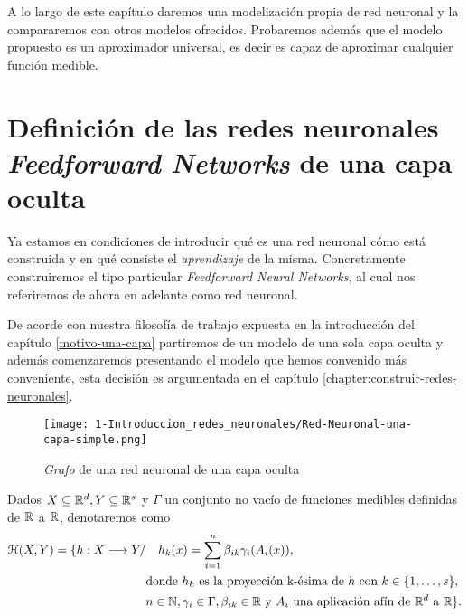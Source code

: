 %

A lo largo de este capítulo daremos una modelización propia de red  neuronal y la compararemos con otros modelos ofrecidos.
Probaremos además que el modelo propuesto es un aproximador universal, es decir es capaz de aproximar cualquier función medible. 


\section{Definición de las redes neuronales \textit{Feedforward Networks} 
de una capa oculta} \label{sec:redes-neuronales-intro-una-capa}

Ya estamos en condiciones de introducir qué es una red neuronal
cómo está construida y en qué consiste el \textit{aprendizaje} de la misma. 
Concretamente
construiremos el tipo particular \textit{Feedforward Neural Networks}, al cual nos referiremos de ahora
en adelante como red neuronal.

De acorde con nuestra filosofía de trabajo expuesta en la introducción del capítulo \ref{motivo-una-capa}
partiremos de un modelo de una sola capa oculta y además comenzaremos presentando el modelo que 
hemos convenido más conveniente, esta decisión es argumentada en el capítulo \ref{chapter:construir-redes-neuronales}. 

\begin{figure}[h!]
    \centering
    \texttt{[image: 1-Introduccion\_redes\_neuronales/Red-Neuronal-una-capa-simple.png]}
    \caption{\textit{Grafo} de una red neuronal de una capa oculta}
    \label{img:grafo-red-neuronal-una-capa-oculta}
\end{figure}

    \begin{aportacionOriginal}
    \begin{definicion} \label{definition:redes_neuronales_una_capa_oculta}
        Dados $X \subseteq \mathbb{R}^d, Y \subseteq \mathbb{R}^s$ y  $\Gamma$ un conjunto no vacío de funciones medibles definidas de $\mathbb{R}$ a $\mathbb{R}$, denotaremos como 
        \begin{align}
            \mathcal{H}(X,Y) 
            =
            \{
                h : X \longrightarrow Y 
                /& \quad 
                h_k(x) = 
                \sum_{i=1}^{n} \beta_{i k} \gamma_{i}( A_{i}(x)), \\
                & \text{donde  $h_k$  es la proyección k-ésima de $h$ con 
                $k \in \{1, \ldots, s\}$}, \\
                & n \in \mathbb{N},\gamma_{i} \in \Gamma , \beta_{i k} \in \mathbb{R}
                \text{ y }A_{i} \text{ una aplicación afín de $\mathbb{R}^d$ a $\mathbb{R}$}           
            \}.
        \end{align}
    \end{definicion}
\end{aportacionOriginal}


